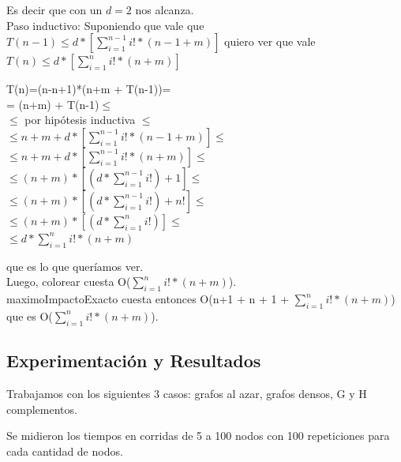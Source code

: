 \indent Es decir que con un $d=2$ nos alcanza.\\


\indent Paso inductivo: Suponiendo que vale que $T(n-1) \leq d * [\sum_{i=1}^{n-1} i! * (n-1+m)] $ quiero ver que vale $T(n) \leq d * [\sum_{i=1}^{n} i! * (n+m)] $ \\


\begin{center}
T(n)=(n-n+1)*(n+m + T(n-1))=\\

= (n+m) + T(n-1)$\leq$\\

$\leq$ por hipótesis inductiva $\leq$\\

$\leq n+m + d * [\sum_{i=1}^{n-1} i! * (n-1+m)] \leq $\\

$\leq n+m + d * [\sum_{i=1}^{n-1} i! * (n+m)] \leq$ \\

$\leq (n+m) *[ (d* \sum_{i=1}^{n-1} i!) + 1] \leq$ \\

$\leq (n+m) *[ (d* \sum_{i=1}^{n-1} i!) + n!] \leq$ \\

$\leq (n+m) *[ (d* \sum_{i=1}^{n} i!)] \leq$\\

$\leq  d* \sum_{i=1}^{n} i!*(n+m)$\\

\end{center}

\indent que es lo que queríamos ver.\\

\indent Luego, colorear cuesta O($\sum_{i=1}^{n} i! * (n+m) $).\\

\indent maximoImpactoExacto cuesta entonces O(n+1 + n + 1 + $\sum_{i=1}^{n} i! * (n+m) $) que es O($\sum_{i=1}^{n} i! * (n+m) $).\\

\subsection{Experimentación y Resultados}
\quad Trabajamos con los siguientes 3 casos: grafos al azar, grafos densos, G y H complementos.

\quad Se midieron los tiempos en corridas de  5 a 100 nodos con 100 repeticiones para cada cantidad de nodos.

